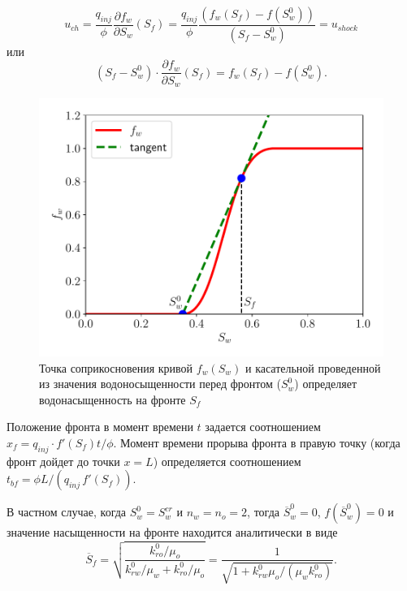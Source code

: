\begin{equation}\label{eq:u_shock_ch}
	u_{ch} = \dfrac{q_{inj}}{\phi} \frac{\partial f_w}{\partial S_w}(S_f) = \dfrac{q_{inj}}{\phi} \dfrac{(f_w(S_f)-f(S_w^0))}{(S_f-S_w^0)} = u_{shock}
\end{equation}
или
\begin{equation}\label{eq:S_front_eq}
	(S_f-S_w^0)\cdot \frac{\partial f_w}{\partial S_w}(S_f)=f_w(S_f)-f(S_w^0).
\end{equation}
\begin{figure}[H]
	\centering
	\includegraphics[width=0.7\linewidth]{img/FwCurveTangent}
	\caption{Точка соприкосновения кривой $f_w(S_w)$ и касательной проведенной из значения водоносыщенности перед фронтом ($S_w^0$) определяет водонасыщенность на фронте $S_f$}
	\label{fig:FwCurveTangent}
\end{figure}

Положение фронта в момент времени $t$ задается соотношением $x_f=q_{inj}\cdot f'(S_f)t /\phi$. Момент времени прорыва фронта в правую точку (когда фронт дойдет до точки $x=L$) определяется соотношением
$  t_{bf}=\phi L / (q_{inj} \,f'(S_f)).$


В частном случае, когда $S_w^0=S_w^{cr}$ и $n_w=n_o=2$, тогда $\overline{S}_w^0=0$, $f(\overline{S}_w^0)=0$ и
значение насыщенности на фронте находится аналитически в виде
\begin{equation}\label{eq:star:exact_sw}
  \overline{S}_f=\sqrt{\frac{k_{ro}^0/\mu_o}{k_{rw}^0/\mu_w+k_{ro}^0/\mu_o}}=\frac{1}{\sqrt{1+k_{rw}^0 \mu_o/ (\mu_w k_{ro}^0)}}.
\end{equation}




